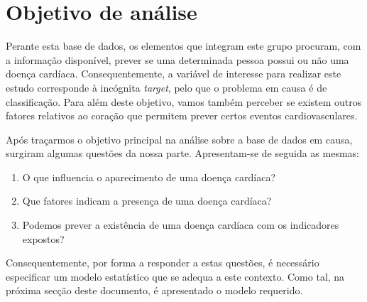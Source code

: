 \documentclass[a4paper]{report}
\begin{document}
{	\section{Objetivo de análise}
	Perante esta base de dados, os elementos que integram este grupo procuram, com a informação disponível, prever se uma determinada pessoa possui ou não uma doença cardíaca. Consequentemente,
	a variável de interesse para realizar este estudo corresponde à incógnita \textit{target}, pelo que o problema em causa é de classificação.
	Para além deste objetivo, vamos também perceber se existem outros fatores relativos ao coração que permitem prever certos eventos cardiovasculares. 
	
	Após traçarmos o objetivo principal na análise sobre a base de dados em causa, surgiram algumas questões da nossa parte. Apresentam-se de seguida as mesmas:
	\begin{enumerate}
	    \item O que influencia o aparecimento de uma doença cardíaca?
	    \item Que fatores indicam a presença de uma doença cardíaca?
		\item Podemos prever a existência de uma doença cardíaca com os indicadores expostos?
	\end{enumerate}
	
	Consequentemente, por forma a responder a estas questões, é necessário especificar um modelo estatístico que se adequa a este contexto. Como tal, na próxima secção deste documento, 
	é apresentado o modelo requerido.
}
\end{document}
